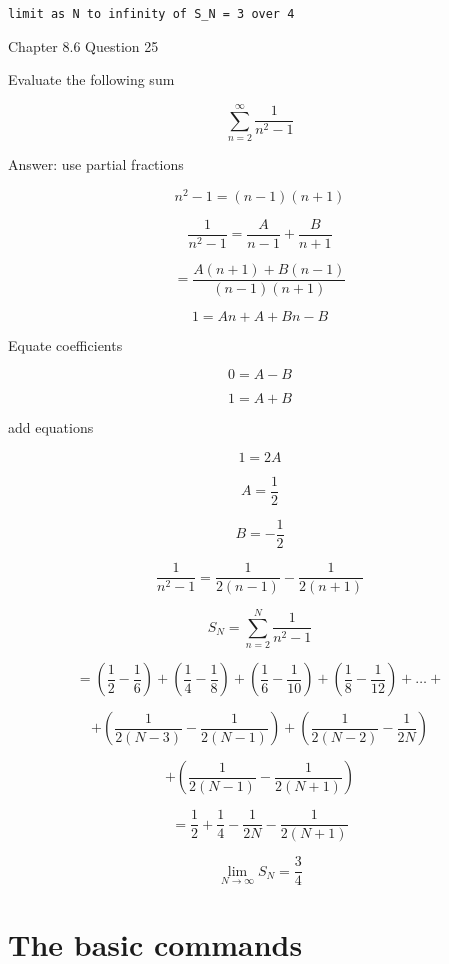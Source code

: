 \documentclass[12pt]{article}
\begin{document}
\noindent \begin{verbatim}
limit as N to infinity of S_N = 3 over 4
\end{verbatim}

\newpage

\noindent Chapter 8.6 Question 25

\noindent Evaluate the following sum

\[
\sum _ {n = 2} ^ {\infty} \frac {1} {{n} ^ {2} - 1}
\]

\noindent Answer: use partial fractions

\[
{n} ^ {2} - 1 = \left( n - 1 \right) \left( n + 1 \right)
\]

\[
\frac {1} {{n} ^ {2} - 1} = \frac {A} {n - 1} + \frac {B} {n + 1}
\]

\[
 = \frac {A \left( n + 1 \right) + B \left( n - 1 \right)} {\left( n - 1 \right) \left( n + 1 \right)}
\]

\[
1 = A n + A + B n - B
\]

\noindent Equate coefficients

\[
0 = A - B
\]

\[
1 = A + B
\]

\noindent add equations

\[
1 = 2 A
\]

\[
A = \frac {1} {2}
\]

\[
B =  - \frac {1} {2}
\]

\[
\frac {1} {{n} ^ 2 - 1} = \frac {1} {2 \left( n - 1 \right)} - \frac {1} {2 \left( n + 1 \right)}
\]

\[
{S} _ {N} = \sum _ {n = 2} ^ {N} \frac {1} {{n} ^ {2} - 1}
\]

\[
 = \left( \frac {1} {2} - \frac {1} {6} \right) + \left( \frac {1} {4} - \frac {1} {8} \right) + \left( \frac {1} {6} - \frac {1} {10} \right) + \left( \frac {1} {8} - \frac {1} {12} \right) + \dots + 
\]

\[
 + \left( \frac {1} {2 \left( N - 3 \right)} - \frac {1} {2 \left( N - 1 \right)} \right) + \left( \frac {1} {2 \left( N - 2 \right)} - \frac {1} {2 N} \right)
\]

\[
 + \left( \frac {1} {2 \left( N - 1 \right)} - \frac {1} {2 \left( N + 1 \right)} \right)
\]

\[
 = \frac {1} {2} + \frac {1} {4} - \frac {1} {2 N} - \frac {1} {2 \left( N + 1 \right)}
\]

\[
\lim _ {N \to \infty} {S} _ {N} = \frac {3} {4}
\]

\newpage

\noindent \section{The basic commands}
\end{document}
